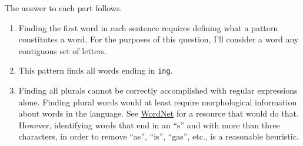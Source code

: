 \documentclass[]{book}
\newenvironment{Shaded}{\begin{snugshade}}{\end{snugshade}}
\newcommand{\CharTok}[1]{\textcolor[rgb]{0.31,0.60,0.02}{#1}}
\newcommand{\CommentTok}[1]{\textcolor[rgb]{0.56,0.35,0.01}{\textit{#1}}}
\newcommand{\KeywordTok}[1]{\textcolor[rgb]{0.13,0.29,0.53}{\textbf{#1}}}
\newcommand{\NormalTok}[1]{#1}
\newcommand{\OperatorTok}[1]{\textcolor[rgb]{0.81,0.36,0.00}{\textbf{#1}}}
\newcommand{\StringTok}[1]{\textcolor[rgb]{0.31,0.60,0.02}{#1}}
\theoremstyle{plain}
\theoremstyle{remark}
\begin{document}
The answer to each part follows.

\begin{enumerate}
\def\labelenumi{\arabic{enumi}.}
\item
  Finding the first word in each sentence requires defining what a
  pattern constitutes a word. For the purposes of this question, I'll
  consider a word any contiguous set of letters.

\begin{Shaded}
\end{Shaded}
\item
  This pattern finds all words ending in \texttt{ing}.

\begin{Shaded}
\end{Shaded}
\item
  Finding all plurals cannot be correctly accomplished with regular
  expressions alone. Finding plural words would at least require
  morphological information about words in the language. See
  \href{https://cran.r-project.org/web/packages/wordnet/index.html}{WordNet}
  for a resource that would do that. However, identifying words that end
  in an ``s'' and with more than three characters, in order to remove
  ``as'', ``is'', ``gas'', etc., is a reasonable heuristic.

\begin{Shaded}
\end{Shaded}
\end{enumerate}
\end{document}
